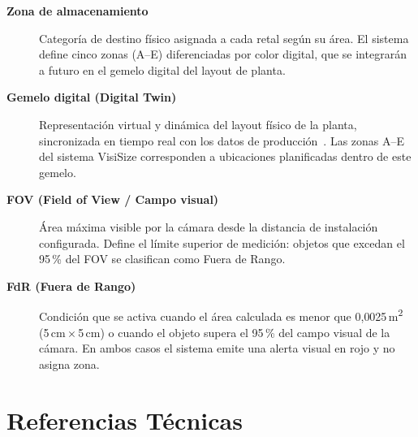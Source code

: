 \documentclass[12pt, a4paper]{article}
\begin{document}
\begin{description}
  \item[\textbf{Zona de almacenamiento}] Categoría de destino físico
  asignada a cada retal según su área. El sistema define cinco zonas (A--E)
  diferenciadas por color digital, que se integrarán a futuro en el gemelo digital
  del layout de planta.

  \item[\textbf{Gemelo digital (Digital Twin)}] Representación virtual y
  dinámica del layout físico de la planta, sincronizada en tiempo real con
  los datos de producción~\cite{tao2018}. Las zonas A--E del sistema VisiSize
  corresponden a ubicaciones planificadas dentro de este gemelo.

  \item[\textbf{FOV (Field of View / Campo visual)}] Área máxima visible
  por la cámara desde la distancia de instalación configurada. Define el límite
  superior de medición: objetos que excedan el 95\,\% del FOV se clasifican
  como Fuera de Rango.

  \item[\textbf{FdR (Fuera de Rango)}] Condición que se activa cuando el área
  calculada es menor que 0{,}0025\,m\textsuperscript{2} (5\,cm\,$\times$\,5\,cm)
  o cuando el objeto supera el 95\,\% del campo visual de la cámara. En ambos
  casos el sistema emite una alerta visual en rojo y no asigna zona.

\end{description}

\section{Referencias Técnicas}
\end{document}
